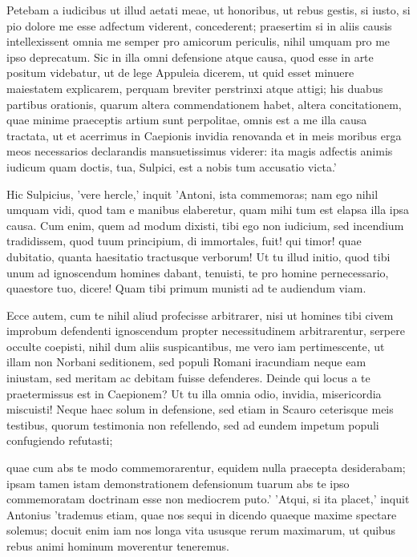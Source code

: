  Petebam a iudicibus ut illud aetati meae, ut honoribus, ut rebus gestis, si iusto, si pio dolore me esse adfectum viderent, concederent; praesertim si in aliis causis intellexissent omnia me semper pro amicorum periculis, nihil umquam pro me ipso deprecatum. Sic in illa omni defensione atque causa, quod esse in arte positum videbatur, ut de lege Appuleia dicerem, ut quid esset minuere maiestatem explicarem, perquam breviter perstrinxi atque attigi; his duabus partibus orationis, quarum altera commendationem habet, altera concitationem, quae minime praeceptis artium sunt perpolitae, omnis est a me illa causa tractata, ut et acerrimus in Caepionis invidia renovanda et in meis moribus erga meos necessarios declarandis mansuetissimus viderer: ita magis adfectis animis iudicum quam doctis, tua, Sulpici, est a nobis tum accusatio victa.'

 Hic Sulpicius, 'vere hercle,' inquit 'Antoni, ista commemoras; nam ego nihil umquam vidi, quod tam e manibus elaberetur, quam mihi tum est elapsa illa ipsa causa. Cum enim, quem ad modum dixisti, tibi ego non iudicium, sed incendium tradidissem, quod tuum principium, di immortales, fuit! qui timor! quae dubitatio, quanta haesitatio tractusque verborum! Ut tu illud initio, quod tibi unum ad ignoscendum homines dabant, tenuisti, te pro homine pernecessario, quaestore tuo, dicere! Quam tibi primum munisti ad te audiendum viam.

 Ecce autem, cum te nihil aliud profecisse arbitrarer, nisi ut homines tibi civem improbum defendenti ignoscendum propter necessitudinem arbitrarentur, serpere occulte coepisti, nihil dum aliis suspicantibus, me vero iam pertimescente, ut illam non Norbani seditionem, sed populi Romani iracundiam neque eam iniustam, sed meritam ac debitam fuisse defenderes. Deinde qui locus a te praetermissus est in Caepionem? Ut tu illa omnia odio, invidia, misericordia miscuisti! Neque haec solum in defensione, sed etiam in Scauro ceterisque meis testibus, quorum testimonia non refellendo, sed ad eundem impetum populi confugiendo refutasti;

 quae cum abs te modo commemorarentur, equidem nulla praecepta desiderabam; ipsam tamen istam demonstrationem defensionum tuarum abs te ipso commemoratam doctrinam esse non mediocrem puto.' 'Atqui, si ita placet,' inquit Antonius 'trademus etiam, quae nos sequi in dicendo quaeque maxime spectare solemus; docuit enim iam nos longa vita ususque rerum maximarum, ut quibus rebus animi hominum moverentur teneremus.

